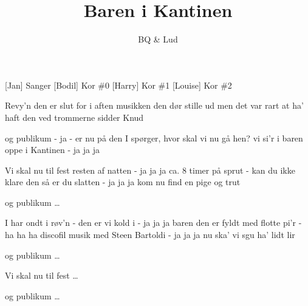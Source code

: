 \documentclass[a4paper,11pt]{article}
\title{Baren i Kantinen}
\author{BQ \& Lud}
\begin{document}
\maketitle

\begin{roles}
[Jan] Sanger 
[Bodil] Kor \#0
[Harry] Kor \#1
[Louise] Kor \#2
\end{roles}

\begin{song}
      Revy'n den er slut for i aften
              musikken den dør stille ud
              men det var rart at ha' haft den
              ved trommerne sidder Knud

     og publikum - ja - er nu på den
              I spørger, hvor skal vi nu gå hen?
              vi si'r i baren
              oppe i Kantinen - ja ja ja

     Vi skal nu til fest resten af natten - ja ja ja
              ca. 8 timer på sprut - kan du
              ikke klare den så er du slatten - ja ja ja
              kom nu find en pige og trut

     og publikum \ldots

     I har ondt i røv'n - den er vi kold i - ja ja ja
              baren den er fyldt med flotte pi'r - ha ha ha
              discofil musik med Steen Bartoldi - ja ja ja
              nu ska' vi sgu ha' lidt lir

     og publikum \ldots


     Vi skal nu til fest \ldots

     og publikum \ldots
\end{song}
\end{document}
